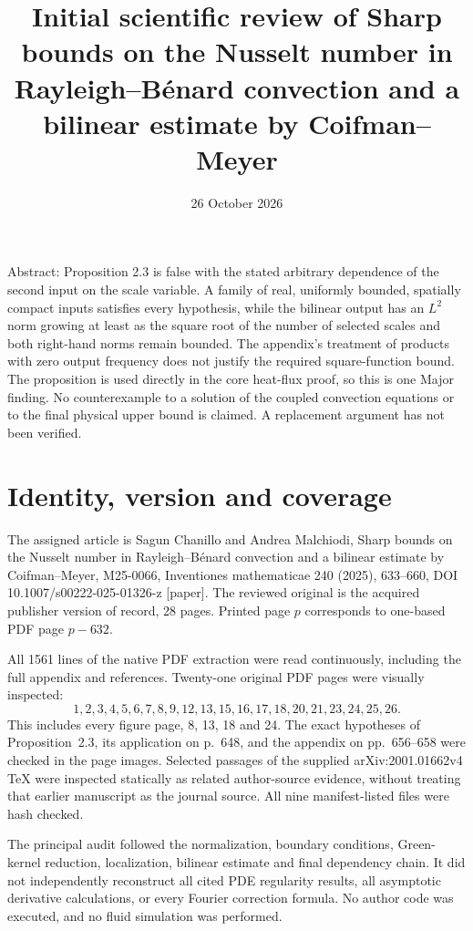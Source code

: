 \documentclass[10pt]{article}
\title{Initial scientific review of
Sharp bounds on the Nusselt number in Rayleigh–Bénard convection and a bilinear estimate by Coifman–Meyer}
\author{}
\date{26 October 2026}
\begin{document}
\maketitle
Abstract: Proposition 2.3 is false with the stated arbitrary dependence of the second input on the scale variable. A family of real, uniformly bounded, spatially compact inputs satisfies every hypothesis, while the bilinear output has an \(L^2\) norm growing at least as the square root of the number of selected scales and both right-hand norms remain bounded. The appendix’s treatment of products with zero output frequency does not justify the required square-function bound. The proposition is used directly in the core heat-flux proof, so this is one Major finding. No counterexample to a solution of the coupled convection equations or to the final physical upper bound is claimed. A replacement argument has not been verified.\par
\section*{Identity, version and coverage}
The assigned article is Sagun Chanillo and Andrea Malchiodi, Sharp bounds on the Nusselt number in Rayleigh–Bénard convection and a bilinear estimate by Coifman–Meyer, M25-0066, Inventiones mathematicae 240 (2025), 633–660, DOI 10.1007/s00222-025-01326-z [paper]. The reviewed original is the acquired publisher version of record, 28 pages. Printed page \(p\) corresponds to one-based PDF page \(p-632\).\par
All 1561 lines of the native PDF extraction were read continuously, including the full appendix and references. Twenty-one original PDF pages were visually inspected: \[1,2,3,4,5,6,7,8,9,12,13,15,16,17,18,20,21,23,24,25,26.\] This includes every figure page, 8, 13, 18 and 24. The exact hypotheses of Proposition 2.3, its application on p. 648, and the appendix on pp. 656–658 were checked in the page images. Selected passages of the supplied arXiv:2001.01662v4 TeX were inspected statically as related author-source evidence, without treating that earlier manuscript as the journal source. All nine manifest-listed files were hash checked.\par
The principal audit followed the normalization, boundary conditions, Green-kernel reduction, localization, bilinear estimate and final dependency chain. It did not independently reconstruct all cited PDE regularity results, all asymptotic derivative calculations, or every Fourier correction formula. No author code was executed, and no fluid simulation was performed.\par
\end{document}
